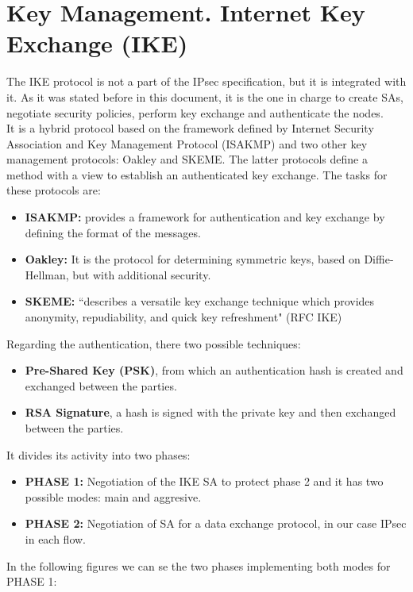 \documentclass[11pt]{book}
\begin{document}
\section{Key Management. Internet Key Exchange (IKE)}
The IKE protocol is not a part of the IPsec specification, but it is integrated with it. As it was stated before in this document, it is the one in charge to create SAs, negotiate security policies, perform key exchange and authenticate the nodes.\\
It is a hybrid protocol based on the framework defined by Internet Security Association and Key Management Protocol (ISAKMP) and two other key management protocols: Oakley and SKEME. The latter protocols define a method with a view to establish an authenticated key exchange. The tasks for these protocols are:
\begin{itemize}
\item \textbf{ISAKMP:} provides a framework for authentication and key exchange by defining the format of the messages.
\item \textbf{Oakley:} It is the protocol for determining symmetric keys, based on Diffie-Hellman, but with additional security.
\item \textbf{SKEME:} ``describes a versatile key exchange technique which provides anonymity, repudiability, and quick key refreshment" (RFC IKE)
\end{itemize}
Regarding the authentication, there two possible techniques:
\begin{itemize}
\item \textbf{Pre-Shared Key (PSK)}, from which an authentication hash is created and exchanged between the parties.
\item \textbf{RSA Signature}, a hash is signed with the private key and then exchanged  between the parties. 
\end{itemize}
It divides its activity into two phases:
\begin{itemize}
\item \textbf{PHASE 1:} Negotiation of the IKE SA to protect phase 2 and it has two possible modes: main and aggresive.
\item \textbf{PHASE 2:} Negotiation of SA for a data exchange protocol, in our case IPsec in each flow.
\end{itemize}
In the following figures we can se the two phases implementing both modes for PHASE 1:
\end{document}
